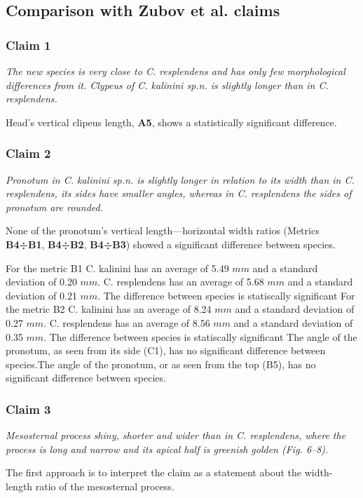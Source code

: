 \subsection{Comparison with Zubov et al. claims}

\subsubsection*{Claim 1}
\textit{The new species is very close to \textit{C. resplendens} and has only few morphological differences from it. Clypeus of \textit{C. kalinini sp.n.} is slightly longer than in \textit{C. resplendens}.}

Head's vertical clipeus length, \textbf{A5}, shows a statistically significant difference. \subsubsection*{Claim 2}
\textit{Pronotum in \textit{C. kalinini sp.n.} is slightly longer in relation to its width than in \textit{C. resplendens}, its sides have smaller angles, whereas in \textit{C. resplendens} the sides of pronotum are rounded.}

None of the pronotum's vertical length---horizontal width ratios (Metrics \textbf{B4÷B1}, \textbf{B4÷B2}, \textbf{B4÷B3}) showed a significant difference between species.

For the metric B1 C. kalinini has an average of 5.49 $mm$ and a standard deviation of  0.20 $mm$. C. resplendens has an average of 5.68 $mm$ and a standard deviation of  0.21 $mm$. The difference between species is statiscally significant
For the metric B2 C. kalinini has an average of 8.24 $mm$ and a standard deviation of  0.27 $mm$. C. resplendens has an average of 8.56 $mm$ and a standard deviation of  0.35 $mm$. The difference between species is statiscally significant
The angle of the pronotum, as seen from its side (C1), has no significant difference between species.The angle of the pronotum, or as seen from the top (B5), has no significant difference between species.\subsubsection*{Claim 3}
\textit{Mesosternal process shiny, shorter and wider than in \textit{C. resplendens}, where the process is long and narrow and its apical half is greenish golden (Fig. 6--8).}

The first approach is to interpret the claim as a statement about the width-length ratio of the mesosternal process. 

